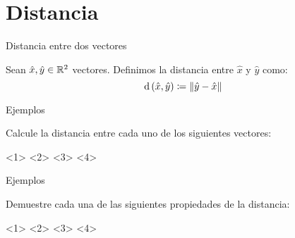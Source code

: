     \section{Distancia}
    \begin{frame}{Distancia entre dos vectores}
        \begin{mdefinition}[Distancia]
            Sean $\hat{x},\hat{y}\in\rmath[2]$ vectores. Definimos la distancia entre $\hat{x}$ y $\hat{y}$ como:
            \[\mdis{\hat{x}, \hat{y}}\coloneqq\norm{\hat{y}-\hat{x}}\]
            \begin{figure}
                \centering
            \end{figure}
        \end{mdefinition}
    \end{frame}
    \begin{frame}{Ejemplos}
        \begin{example}
            Calcule la distancia entre cada uno de los siguientes vectores:
            \begin{itemize}
                <1>
                <2>
                <3>
                <4>
            \end{itemize}
        \end{example}
    \end{frame}
    \begin{frame}{Ejemplos}
        \begin{example}
            Demuestre cada una de las siguientes propiedades de la distancia:
            \begin{itemize}
                <1>
                <2>
                <3>
                <4>
            \end{itemize}
        \end{example}
    \end{frame}
